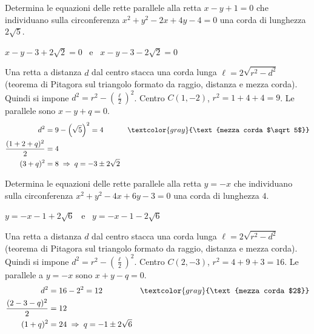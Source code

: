 
\begin{question}[ID=3.14, subtitle={Corda di lunghezza $2\sqrt{5}$ parallela a $x-y+1=0$}, difficulty=media, tags={circonferenza, corda}]
Determina le equazioni delle rette parallele alla retta $x-y+1=0$ che individuano sulla circonferenza $x^2+y^2-2x+4y-4=0$ una corda di lunghezza $2\sqrt{5}$.
\begin{solution}
$x-y-3+2\sqrt2=0$ \ e \ $x-y-3-2\sqrt2=0$
\end{solution}
\begin{explanation}
Una retta a distanza $d$ dal centro stacca una corda lunga $\ell=2\sqrt{r^2-d^2}$ (teorema di Pitagora sul triangolo formato da raggio, distanza e mezza corda). Quindi si impone $d^2=r^2-\left(\tfrac\ell2\right)^2$.
Centro $C(1,-2)$, $r^2=1+4+4=9$. Le parallele sono $x-y+q=0$.
\[\begin{aligned}
d^2 &= 9-\left(\sqrt5\right)^2=4 && \textcolor{gray}{\text{mezza corda $\sqrt5$}}\\
\dfrac{(1+2+q)^2}{2} &= 4\\
(3+q)^2 &= 8 \;\Rightarrow\; q=-3\pm2\sqrt2
\end{aligned}\]
\end{explanation}
\end{question}


\begin{question}[ID=3.15, subtitle={Corda di lunghezza 4 parallela a $y=-x$ sulla circonferenza}, difficulty=difficile, tags={circonferenza, corda, parametrico}]
Determina le equazioni delle rette parallele alla retta $y=-x$ che individuano sulla circonferenza $x^2+y^2-4x+6y-3=0$ una corda di lunghezza $4$.
\begin{solution}
$y=-x-1+2\sqrt6$ \ e \ $y=-x-1-2\sqrt6$
\end{solution}
\begin{explanation}
Una retta a distanza $d$ dal centro stacca una corda lunga $\ell=2\sqrt{r^2-d^2}$ (teorema di Pitagora sul triangolo formato da raggio, distanza e mezza corda). Quindi si impone $d^2=r^2-\left(\tfrac\ell2\right)^2$.
Centro $C(2,-3)$, $r^2=4+9+3=16$. Le parallele a $y=-x$ sono $x+y-q=0$.
\[\begin{aligned}
d^2 &= 16-2^2=12 && \textcolor{gray}{\text{mezza corda $2$}}\\
\dfrac{(2-3-q)^2}{2} &= 12\\
(1+q)^2 &= 24 \;\Rightarrow\; q=-1\pm2\sqrt6
\end{aligned}\]
\end{explanation}
\end{question}

